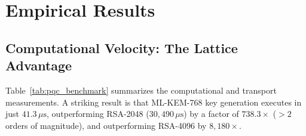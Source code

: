 \begin{table}[t]
\centering
\small
\caption{\textbf{Empirical performance and network wire overhead across classical and post-quantum key exchange mechanisms.} Timings measured with compiled C-extensions across independent trials. Wire sizes evaluate raw KEM exchange, RFC 8446 \texttt{ClientHello} flight, and TCP segment counts over standard $1{,}460$-byte Ethernet MSS.}
\label{tab:pqc_benchmark}
\end{table}

\section{Empirical Results}

\subsection{Computational Velocity: The Lattice Advantage}
Table~\ref{tab:pqc_benchmark} summarizes the computational and transport measurements. A striking result is that ML-KEM-768 key generation executes in just $41.3\,\mu\mathrm{s}$, outperforming RSA-2048 ($30{,}490\,\mu\mathrm{s}$) by a factor of $738.3\times$ ($> 2$ orders of magnitude), and outperforming RSA-4096 by $8{,}180\times$. 

